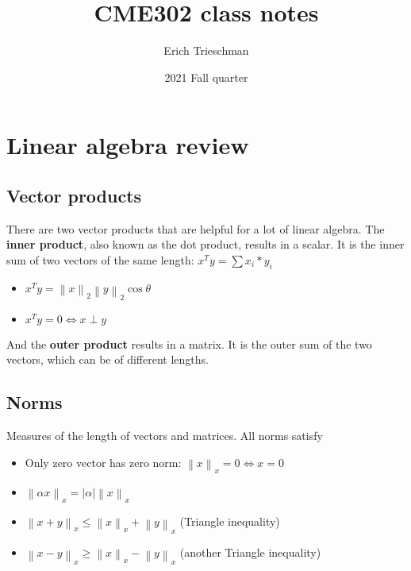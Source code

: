 \documentclass{article}
\title{CME302 class notes}
\author{Erich Trieschman}
\date{2021 Fall quarter}
\newcommand{\norm}[2]{\left\lVert#1\right\rVert_#2}
\newcommand{\abs}[1]{\lvert#1\rvert}
\begin{document}
\maketitle

\section{Linear algebra review}

\subsection{Vector products}
There are two vector products that are helpful for a lot of linear algebra. The
\textbf{inner product}, also known as the dot product, results in a scalar. It is the inner sum of two vectors of the same length: $x^Ty = \sum x_i*y_i$
\begin{itemize}
    \item $x^Ty = \norm{x}{2}\norm{y}{2}\cos\theta$
    \item $x^Ty = 0 \Leftrightarrow x \perp y$
\end{itemize}
And the \textbf{outer product} results in a matrix. It is the outer sum of the two vectors, which can be of different lengths.


\subsection{Norms}
Measures of the length of vectors and matrices. All norms satisfy
\begin{itemize}
    \item Only zero vector has zero norm: $\norm{x}{x} = 0 \Leftrightarrow x = 0$
    \item $\norm{\alpha x}{x} = \abs{\alpha}\norm{x}{x}$
    \item $\norm{x+y}{x} \leq \norm{x}{x} + \norm{y}{x}$ (Triangle inequality)
    \item $\norm{x-y}{x} \geq \norm{x}{x} - \norm{y}{x}$ (another Triangle inequality)
\end{itemize}
\end{document}
